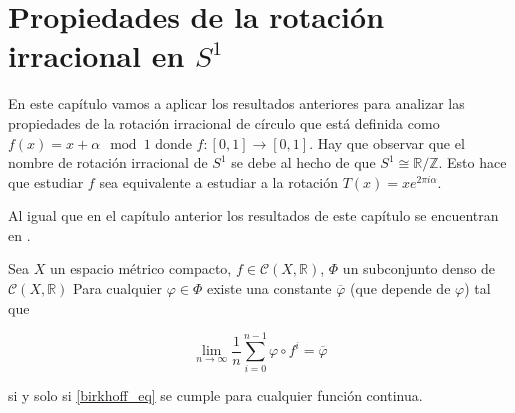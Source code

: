 \chapter{Propiedades de la rotación irracional en $S^1$}

En este capítulo vamos a aplicar los resultados anteriores para analizar las propiedades de la rotación irracional de círculo que está definida como $f(x) = x + \alpha \mod 1$ donde $f: [0,1] \rightarrow [0,1]$. Hay que observar que el nombre de rotación irracional de $S^1$ se debe al hecho de que $S^1 \cong \mathbb{R}/\mathbb{Z}$. Esto hace que estudiar $f$ sea equivalente a estudiar a la rotación $T(x) = x e^{2\pi i \alpha}$.

Al igual que en el capítulo anterior los resultados de este capítulo se encuentran en \cite{youtube}.

\begin{lema}\label{lema_varphi_m}
	Sea $X$ un espacio métrico compacto, $f \in \mathcal{C}(X,\mathbb{R})$, $\Phi$ un subconjunto denso de $\mathcal{C}(X, \mathbb{R})$ Para cualquier $\varphi \in \Phi$ existe una constante $\overline{\varphi}$ (que depende de $\varphi$) tal que
	
	\begin{equation}\label{birkhoff_eq}
		\lim_{n \rightarrow \infty} \frac{1}{n} \sum_{i=0}^{n-1} \varphi \circ f^i = \overline{\varphi}
	\end{equation}
	
	si y solo si \eqref{birkhoff_eq} se cumple para cualquier función continua.
\end{lema}

